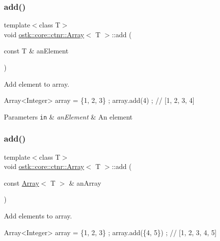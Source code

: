 \subsubsection{\texorpdfstring{add()}{add()}\hspace{0.1cm}{\footnotesize\ttfamily [1/2]}}
{\footnotesize\ttfamily template$<$class T$>$ \\
void \hyperlink{classostk_1_1core_1_1ctnr_1_1_array}{ostk\+::core\+::ctnr\+::\+Array}$<$ T $>$\+::add (\begin{DoxyParamCaption}\item[{const T \&}]{an\+Element }\end{DoxyParamCaption})}



Add element to array. 


\begin{DoxyCode}
Array<Integer> array = \{1, 2, 3\} ;
array.add(4) ; \textcolor{comment}{// [1, 2, 3, 4]}
\end{DoxyCode}



\begin{DoxyParams}[1]{Parameters}
\mbox{\tt in}  & {\em an\+Element} & An element \\
\hline
\end{DoxyParams}
\mbox{\label{classostk_1_1core_1_1ctnr_1_1_array_a53cc258c0052dee12217670f2bca3540}} 
\subsubsection{\texorpdfstring{add()}{add()}\hspace{0.1cm}{\footnotesize\ttfamily [2/2]}}
{\footnotesize\ttfamily template$<$class T$>$ \\
void \hyperlink{classostk_1_1core_1_1ctnr_1_1_array}{ostk\+::core\+::ctnr\+::\+Array}$<$ T $>$\+::add (\begin{DoxyParamCaption}\item[{const \hyperlink{classostk_1_1core_1_1ctnr_1_1_array}{Array}$<$ T $>$ \&}]{an\+Array }\end{DoxyParamCaption})}



Add elements to array. 


\begin{DoxyCode}
Array<Integer> array = \{1, 2, 3\} ;
array.add(\{4, 5\}) ; \textcolor{comment}{// [1, 2, 3, 4, 5]}
\end{DoxyCode}



